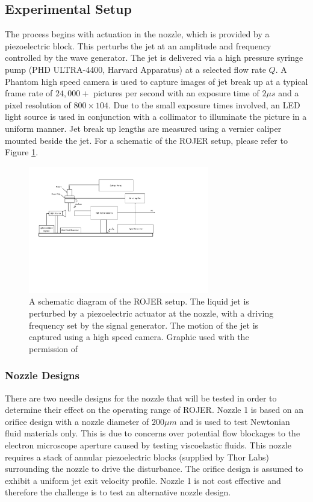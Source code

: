 \documentclass[11pt]{article}
\begin{document}
\subsection{Experimental Setup}
The process begins with actuation in the nozzle, which is provided by a piezoelectric block. This perturbs the jet at an amplitude and frequency controlled by the wave generator. The jet is delivered via a high pressure syringe pump (PHD ULTRA-4400, Harvard Apparatus) at a selected flow rate $Q$. A Phantom high speed camera is used to capture images of jet break up at a typical frame rate of $24,000 +$ pictures per second with an exposure time of $2 \mu s$ and a pixel resolution of $800 \times 104$. Due to the small exposure times involved, an LED light source is used in conjunction with a collimator to illuminate the picture in a uniform manner. Jet break up lengths are measured using a vernier caliper mounted beside the jet. For a schematic of the ROJER setup, please refer to Figure \ref{fig:schematic}. 
\begin{figure}[h]
\begin{center}
	\includegraphics[trim=0cm 9cm 8cm 1.5cm, width = 0.7\textwidth]{img/ROJER_schematic.pdf}
	\caption{A schematic diagram of the ROJER setup. The liquid jet is perturbed by a piezoelectric actuator at the nozzle, with a driving frequency set by the signal generator. The motion of the jet is captured using a high speed camera. Graphic used with the permission of \cite{greiciunas2015report}}
	\label{fig:schematic}
\end{center}
\end{figure}

\subsubsection{Nozzle Designs} \label{sec:nozzles}

There are two needle designs for the nozzle that will be tested in order to determine their effect on the operating range of ROJER. Nozzle 1 is based on an orifice design with a nozzle diameter of $200 \mu m$ and is used to test Newtonian fluid materials only. This is due to concerns over potential flow blockages to the electron microscope aperture caused by testing viscoelastic fluids. This nozzle requires a stack of annular piezoelectric blocks (supplied by Thor Labs) surrounding the nozzle to drive the disturbance. The orifice design is assumed to exhibit a uniform jet exit velocity profile. Nozzle 1 is not cost effective and therefore the challenge is to test an alternative nozzle design.
\end{document}
